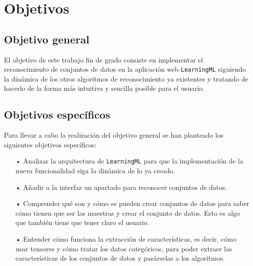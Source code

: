 \documentclass[a4paper, 12pt]{book}
\begin{document}

\cleardoublepage %
\chapter{Objetivos} %
\label{chap:objetivos} %

\section{Objetivo general} %
\label{sec:objetivo-general} %

El objetivo de este trabajo fin de grado consiste en implementar el reconocimiento de conjuntos de datos en la aplicación web \texttt{LearningML} siguiendo la dinámica de los otros algoritmos de reconocimiento ya existentes y tratando de hacerlo de la forma más intuitiva y sencilla posible para el usuario.


\section{Objetivos específicos}
\label{sec:objetivos-especificos}

Para llevar a cabo la realización del objetivo general se han planteado los siguientes objetivos específicos:

\begin{itemize}

\item[•] Analizar la arquitectura de \texttt{LearningML} para que la implementación de la nueva funcionalidad siga la dinámica de lo ya creado.

\item[•] Añadir a la interfaz un apartado para reconocer conjuntos de datos.

\item[•] Comprender qué son y cómo se pueden crear conjuntos de datos para saber cómo tienen que ser las muestras y crear el conjunto de datos. Esto es algo que también tiene que tener claro el usuario.

\item[•] Entender cómo funciona la extracción de características, es decir, cómo usar tensores y cómo tratar los datos categóricos, para poder extraer las características de los conjuntos de datos y pasárselas a los algoritmos.

\end{itemize}
\end{document}
